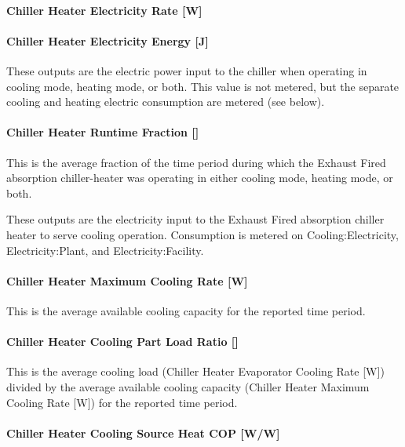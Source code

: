 \paragraph{Chiller Heater Electricity Rate {[}W{]}}\label{chiller-heater-electric-power-w-1}

\paragraph{Chiller Heater Electricity Energy {[}J{]}}\label{chiller-heater-electric-energy-j-1}

These outputs are the electric power input to the chiller when operating in cooling mode, heating mode, or both. This value is not metered, but the separate cooling and heating electric consumption are metered (see below).

\paragraph{Chiller Heater Runtime Fraction {[]}}\label{chiller-heater-runtime-fraction-1}

This is the average fraction of the time period during which the Exhaust Fired absorption chiller-heater was operating in either cooling mode, heating mode, or both.

These outputs are the electricity input to the Exhaust Fired absorption chiller heater to serve cooling operation. Consumption is metered on Cooling:Electricity, Electricity:Plant, and Electricity:Facility.

\paragraph{Chiller Heater Maximum Cooling Rate {[}W{]}}\label{chiller-heater-maximum-cooling-rate-w}

This is the average available cooling capacity for the reported time period.

\paragraph{Chiller Heater Cooling Part Load Ratio {[]}}\label{chiller-heater-cooling-part-load-ratio-1}

This is the average cooling load (Chiller Heater Evaporator Cooling Rate {[}W{]}) divided by the average available cooling capacity (Chiller Heater Maximum Cooling Rate {[}W{]}) for the reported time period.

\paragraph{Chiller Heater Cooling Source Heat COP {[}W/W{]}}\label{chiller-heater-cooling-source-heat-cop-ww}

